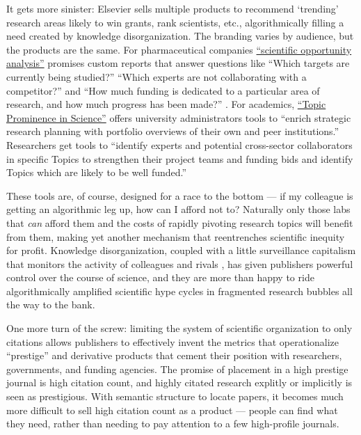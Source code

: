 \documentclass[10pt]{article}
\begin{document}
\begin{multicols}{2}
It gets more sinister: Elsevier sells multiple products to recommend
`trending' research areas likely to win grants, rank scientists, etc.,
algorithmically filling a need created by knowledge disorganization. The
branding varies by audience, but the products are the same. For
pharmaceutical companies
\href{https://www.elsevier.com/solutions/professional-services/drug-design-optimization\#opportunity}{``scientific
opportunity analysis''} promises custom reports that answer questions
like ``Which targets are currently being studied?'' ``Which experts are
not collaborating with a competitor?'' and ``How much funding is
dedicated to a particular area of research, and how much progress has
been made?'' \cite{elsevierDrugDesignOptimization} . For
academics,
\href{https://www.elsevier.com/solutions/scival/features/topic-prominence-in-science\#how}{``Topic
Prominence in Science''} offers university administrators tools to
``enrich strategic research planning with portfolio overviews of their
own and peer institutions.'' Researchers get tools to ``identify experts
and potential cross-sector collaborators in specific Topics to
strengthen their project teams and funding bids and identify Topics
which are likely to be well funded.'' \cite{elsevierTopicProminenceScienceb} 

These tools are, of course, designed for a race to the bottom --- if my
colleague is getting an algorithmic leg up, how can I afford not to?
Naturally only those labs that \emph{can} afford them and the costs of
rapidly pivoting research topics will benefit from them, making yet
another mechanism that reentrenches scientific inequity for profit.
Knowledge disorganization, coupled with a little surveillance capitalism
that monitors the activity of colleagues and rivals \cite{brembsReplacingAcademicJournals2021} , has given publishers powerful
control over the course of science, and they are more than happy to ride
algorithmically amplified scientific hype cycles in fragmented research
bubbles all the way to the bank.

One more turn of the screw: limiting the system of scientific
organization to only citations allows publishers to effectively invent
the metrics that operationalize ``prestige'' and derivative products
that cement their position with researchers, governments, and funding
agencies. The promise of placement in a high prestige journal is high
citation count, and highly citated research explitly or implicitly is
seen as prestigious. With semantic structure to locate papers, it
becomes much more difficult to sell high citation count as a product ---
people can find what they need, rather than needing to pay attention to
a few high-profile journals.


\end{multicols}
\end{document}
